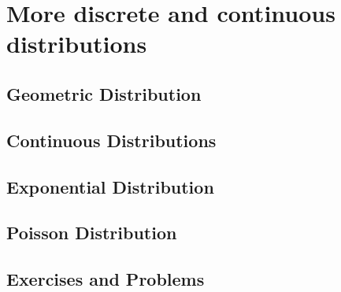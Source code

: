 \section{More discrete and continuous distributions}

\subsection{Geometric Distribution}

\subsection{Continuous Distributions}

\subsection{Exponential Distribution}

\subsection{Poisson Distribution}

\subsection{Exercises and Problems}
